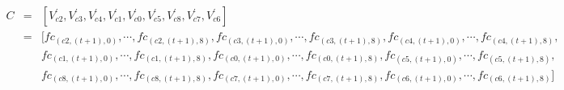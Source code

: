 \documentclass[12pt,a4paper]{article}
\begin{document}
\begin{equation*}
\begin{aligned}
C & = & [V_{c2}^{'}, V_{c3}^{'}, V_{c4}^{'}, V_{c1}^{'}, V_{c0}^{'}, V_{c5}^{'}, V_{c8}^{'}, V_{c7}^{'}, V_{c6}^{'}]  \\
  & = & [fc_{(c2,(t+1), 0)}, \cdots, fc_{(c2,(t+1), 8)}, fc_{(c3,(t+1), 0)}, \cdots, fc_{(c3,(t+1), 8)}, fc_{(c4,(t+1), 0)}, \cdots, fc_{(c4,(t+1), 8)}, \\
  &   & fc_{(c1,(t+1), 0)}, \cdots, fc_{(c1,(t+1), 8)},fc_{(c0,(t+1), 0)}, \cdots,　fc_{(c0,(t+1), 8)},　fc_{(c5,(t+1), 0)},　\cdots, fc_{(c5,(t+1), 8)}, \\
  &   & fc_{(c8,(t+1), 0)}, \cdots, fc_{(c8,(t+1), 8)}, fc_{(c7,(t+1), 0)}, \cdots, fc_{(c7,(t+1), 8)}, fc_{(c6,(t+1), 0)}, \cdots, fc_{(c6,(t+1), 8)}]
\end{aligned}
\end{equation*}
\ifx\allfiles\undefined
\end{document}
